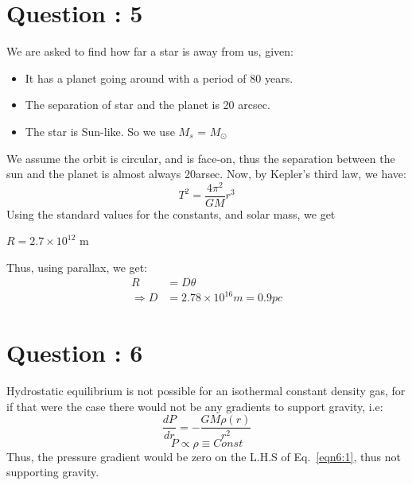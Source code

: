 \documentclass{article}
\begin{document}
\section{Question : 5}
We are asked to find how far a star is away from us, given:
\begin{itemize}
\item It has a planet going around with a period of 80 years. 
\item The separation of star and the planet is 20 arcsec.
\item The star is Sun-like. So we use $M_s$ = $M_\odot$
\end{itemize}
We assume the orbit is circular, and is face-on, thus the separation between the sun and the planet is almost always 20arsec. Now, by Kepler's third law, we have:
\begin{equation}
T^2 = \frac{4\pi^2}{GM} r^3
\label{eq5:1}
\end{equation}
Using the standard values for the constants, and solar mass, we get 
\begin{center}
$R = 2.7\times 10^{12} $ m
\end{center}
Thus, using parallax, we get:
\begin{equation}
\begin{split}
R &= D\theta \\
\Rightarrow D &= 2.78 \times 10^{16} m = 0.9 pc
\end{split}
\end{equation}
\section{Question : 6}
Hydrostatic equilibrium is not possible for an isothermal constant density gas, for if that were the case there would not be any gradients to support gravity, i.e:
\begin{equation}
\frac{dP}{dr} = -\frac{GM\rho(r)}{r^2} 
\label{eqn6:1}
\end{equation}
$$P \propto \rho \equiv Const $$
Thus, the pressure gradient would be zero on the L.H.S of Eq.~\ref{eqn6:1}, thus not supporting gravity. 
\end{document}
